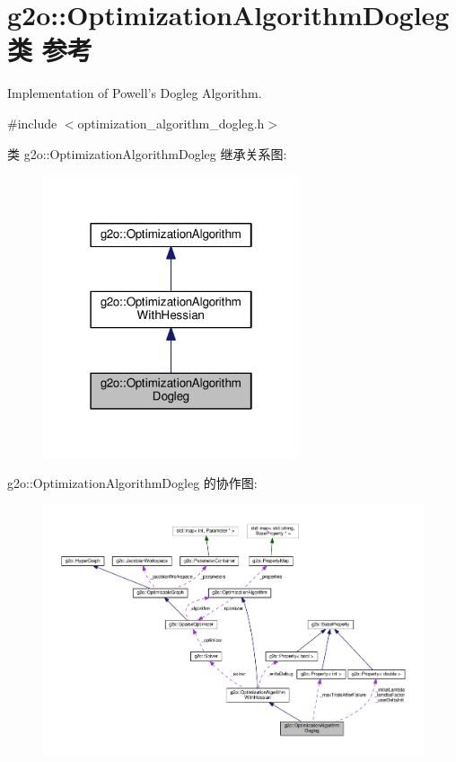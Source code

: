 \hypertarget{classg2o_1_1OptimizationAlgorithmDogleg}{\section{g2o\-:\-:Optimization\-Algorithm\-Dogleg类 参考}
\label{classg2o_1_1OptimizationAlgorithmDogleg}
}


Implementation of Powell's Dogleg Algorithm.  




{\ttfamily \#include $<$optimization\-\_\-algorithm\-\_\-dogleg.\-h$>$}



类 g2o\-:\-:Optimization\-Algorithm\-Dogleg 继承关系图\-:
\nopagebreak
\begin{figure}[H]
\begin{center}
\leavevmode
\includegraphics[width=214pt]{classg2o_1_1OptimizationAlgorithmDogleg__inherit__graph}
\end{center}
\end{figure}


g2o\-:\-:Optimization\-Algorithm\-Dogleg 的协作图\-:
\nopagebreak
\begin{figure}[H]
\begin{center}
\leavevmode
\includegraphics[width=350pt]{classg2o_1_1OptimizationAlgorithmDogleg__coll__graph}
\end{center}
\end{figure}
